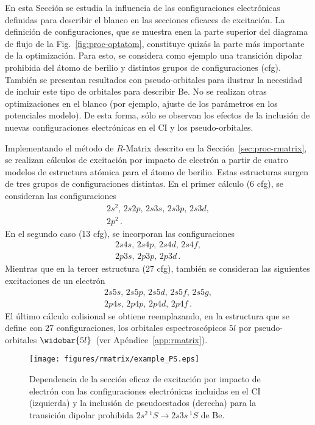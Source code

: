 En esta Sección se estudia la influencia de las configuraciones 
electrónicas definidas para describir el blanco en las secciones 
eficaces de excitación. La definición de configuraciones, que se muestra
enen la parte superior del diagrama de flujo de 
la Fig.~\ref{fig:proc-optatom}, constituye quizás la parte más 
importante de la optimización. 
Para esto, se considera como ejemplo una transición dipolar prohibida 
del átomo de berilio y distintos grupos de configuraciones (cfg). 
También se presentan resultados con pseudo-orbitales para ilustrar la 
necesidad de incluir este tipo de orbitales para describir Be. No se 
realizan otras optimizaciones en el blanco (por ejemplo, ajuste de los 
parámetros en los potenciales modelo). De esta forma, sólo se observan 
los efectos de la inclusión de nuevas configuraciones electrónicas en el 
CI y los pseudo-orbitales. 

Implementando el método de $R$-Matrix descrito en la 
Sección~\ref{sec:proc-rmatrix}, se realizan cálculos de excitación por 
impacto de electrón a partir de cuatro modelos de estructura atómica 
para el átomo de berilio. Estas estructuras surgen de tres grupos de 
configuraciones distintas. En el primer cálculo (6 cfg), se consideran 
las configuraciones 
\begin{gather}
2s^2,\,2s2p,\,2s3s,\,2s3p,\,2s3d,
\label{eq:cfgA}\\
2p^2\,.
\label{eq:cfgB}
\end{gather} 
En el segundo caso (13 cfg), se incorporan las configuraciones 
\begin{gather}
2s4s,\,2s4p,\,2s4d,\,2s4f,
\label{eq:cfgC}\\
2p3s,\,2p3p,\,2p3d\,.
\label{eq:cfgD}
\end{gather} 
Mientras que en la tercer estructura (27 cfg), también se consideran las 
siguientes excitaciones de un electrón 
\begin{gather}
2s5s,\,2s5p,\,2s5d,\,2s5f,\,2s5g,
\label{eq:cfgE}\\
2p4s,\,2p4p,\,2p4d,\,2p4f\,.
\label{eq:cfgF}
\end{gather} 
El último cálculo colisional se obtiene reemplazando, en la estructura 
que se define con 27 configuraciones, los orbitales espectroscópicos 
$5l$ por pseudo-orbitales $\widebar{5l}$~(ver Apéndice~\ref{app:rmatrix}).

\begin{figure}[t]
\centering
\texttt{[image: figures/rmatrix/example\_PS.eps]}
\caption[Dependencia de la sección eficaz de excitación con las 
configuraciones electrónicas y los pseudoestados.]
{Dependencia de la sección eficaz de excitación por impacto de
electrón con las configuraciones electrónicas incluidas en el CI 
(izquierda) y la inclusión de pseudoestados (derecha) para la transición 
dipolar prohibida $2s^2\,^1S \rightarrow 2s3s\,^1S$ de Be.}
\label{fig:dependencia-CI}
\end{figure}

